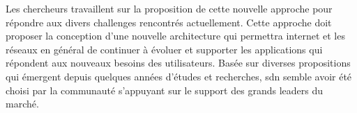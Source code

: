 

Les chercheurs travaillent sur la proposition de cette nouvelle approche pour répondre aux divers challenges rencontrés actuellement. 
Cette approche doit proposer la conception d'une nouvelle architecture qui permettra internet et les réseaux en général de continuer à évoluer et supporter les applications qui répondent aux nouveaux besoins des utilisateurs. 
Basée sur diverses propositions qui émergent depuis quelques années d'études et recherches, \gls{sdn} semble avoir été choisi par la communauté s'appuyant sur le support des grands leaders du marché.  \cite{SurveySDNIntro}


